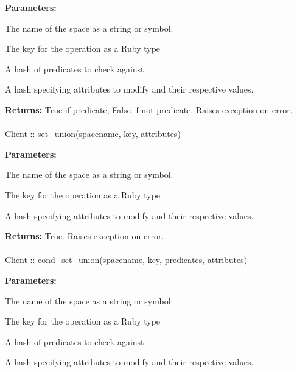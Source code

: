 \noindent\textbf{Parameters:}
\begin{description}[labelindent=\widthof{{\code{predicates}}},leftmargin=*,noitemsep,nolistsep,align=right]
\item[\code{spacename}] The name of the space as a string or symbol.
\item[\code{key}] The key for the operation as a Ruby type
\item[\code{predicates}] A hash of predicates to check against.
\item[\code{attributes}] A hash specifying attributes to modify and their respective values.
\end{description}

\noindent\textbf{Returns:}
True if predicate, False if not predicate.  Raises exception on error.

\paragraph{}
\begin{ccode}
Client :: set_union(spacename, key, attributes)
\end{ccode}
\funcdesc 

\noindent\textbf{Parameters:}
\begin{description}[labelindent=\widthof{{\code{attributes}}},leftmargin=*,noitemsep,nolistsep,align=right]
\item[\code{spacename}] The name of the space as a string or symbol.
\item[\code{key}] The key for the operation as a Ruby type
\item[\code{attributes}] A hash specifying attributes to modify and their respective values.
\end{description}

\noindent\textbf{Returns:}
True.  Raises exception on error.

\paragraph{}
\begin{ccode}
Client :: cond_set_union(spacename, key, predicates, attributes)
\end{ccode}
\funcdesc 

\noindent\textbf{Parameters:}
\begin{description}[labelindent=\widthof{{\code{predicates}}},leftmargin=*,noitemsep,nolistsep,align=right]
\item[\code{spacename}] The name of the space as a string or symbol.
\item[\code{key}] The key for the operation as a Ruby type
\item[\code{predicates}] A hash of predicates to check against.
\item[\code{attributes}] A hash specifying attributes to modify and their respective values.
\end{description}

